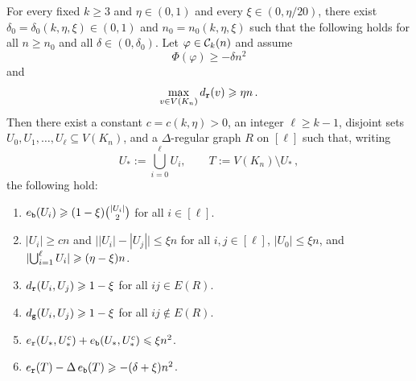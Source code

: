 \begin{lemma}\label{lemma:kth-order-recursion}
For every fixed $k\geq3$ and $\eta\in(0,1)$ and every $\xi\in(0,\eta/20)$, there exist $\delta_0=\delta_0(k,\eta,\xi)\in(0,1)$ and $n_0=n_0(k,\eta,\xi)$ such that the following holds for all $n\geq n_0$ and all $\delta\in(0,\delta_0)$. Let $\varphi\in{\mathcal C}_k(n)$ and assume
\begin{equation}\label{eq:recursion-assumption-phi-new}
\Phi(\varphi)\geq-\delta n^2
\end{equation}
and
\begin{equation}\label{eq:maxreddeg-assump}
\max_{v\in V(K_n)}d_{\normalfont\texttt r}(v)\geqslant \eta n\,.
\end{equation}
Then there exist a constant $c=c(k,\eta)>0$, an integer $\ell\geq k-1$, disjoint sets $U_0,U_1,\dots,U_\ell\subseteq V(K_n)$, and a $\Delta$-regular graph $R$ on $[\ell]$ such that, writing
$$U_\ast:=\bigcup_{i=0}^{\ell}U_i,\qquad T:=V(K_n)\setminus U_\ast\,,$$
the following hold:
\begin{enumerate}[
  label=\textit{(\roman*)},
  ref=(\textit{\roman*}),
  topsep=5pt
]
\item\label{item:kth-rec-blue-dense} $e_{\normalfont\texttt b}(U_i)\geqslant(1-\xi)\binom{|U_i|}{2}$ for all $i\in[\ell]$.
\item\label{item:kth-rec-sizes} $|U_i|\geq cn$ and $\big||U_i|-|U_j|\big|\leq \xi n$ for all $i,j\in[\ell]$, $|U_0|\leq \xi n$, and $\lvert\bigcup_{i=1}^{\ell}U_i\rvert\geqslant (\eta-\xi)n$.
\item\label{item:kth-rec-red-dens} $d_{\normalfont\texttt r}(U_i,U_j)\geqslant1-\xi$ for all $ij\in E(R)$.
\item\label{item:kth-rec-green-dens} $d_{\normalfont\texttt g}(U_i,U_j)\geqslant1-\xi$ for all $ij\notin E(R)$.
\item\label{item:kth-rec-small-bdry} $e_{\normalfont\texttt r}(U_\ast,U_\ast^c)+e_{\normalfont\texttt b}(U_\ast,U_\ast^c)\leqslant \xi n^2$.
\item\label{item:kth-rec-extr-pres} $e_{\normalfont\texttt r}(T)-\Delta\,e_{\normalfont\texttt b}(T)\geqslant-(\delta+\xi)n^2$.
\end{enumerate}
\end{lemma}
